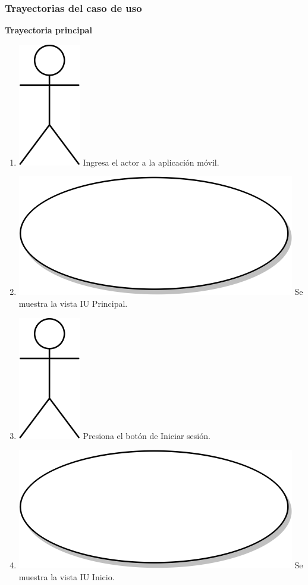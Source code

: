 \subsubsection{Trayectorias del caso de uso}
\textbf{Trayectoria principal}
\begin{enumerate}
   \item {\includegraphics[scale=.1]{Capitulo3/img/actor.png} Ingresa el actor a la aplicación móvil.}
\item {\includegraphics[scale=.05]{Capitulo3/img/proceso.png} Se muestra la vista IU Principal.}
\item {\includegraphics[scale=.1]{Capitulo3/img/actor.png} Presiona el botón de Iniciar sesión.}
\item {\includegraphics[scale=.05]{Capitulo3/img/proceso.png} Se muestra la vista IU Inicio.}

\end{enumerate}
